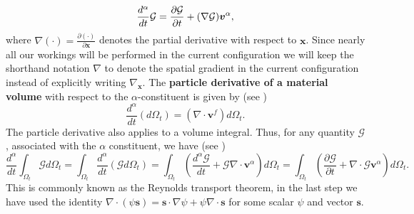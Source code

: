 \begin{equation}
\frac{d^{\alpha}}{dt} \mathcal{G}=\frac{\partial \mathcal{G}}{\partial t}  + (\nabla\mathcal{G})\boldsymbol{v}^{\alpha},
\end{equation}
where $\nabla( \cdot)= \frac{\partial (\cdot) }{\partial \boldsymbol{x} } $ denotes the partial derivative with respect to $\boldsymbol{x}$. Since nearly all our workings will be performed in the current configuration we will keep the shorthand notation $\nabla$ to denote the spatial gradient in the current configuration instead of explicitly writing  $\nabla_{\boldsymbol{x}}$. The \textbf{particle derivative of a material volume} with respect to the $\alpha$-constituent is given by (see \citep[eqn. (1.42)]{coussy2004poromechanics})
\begin{equation}
\frac{d^{\alpha}}{dt} (d \Omega_{t})=\left(\nabla \cdot \boldsymbol{v}^{f}   \right)d \Omega_{t}. 
\end{equation}
The particle derivative also applies to a volume integral. Thus, for any quantity $\mathcal{G}$, associated with the $\alpha$ constituent, we have (see \citep[eqn. (1.47)]{coussy2004poromechanics})
\begin{equation}
\label{eqn:reynolds_transport}
\frac{d^{\alpha}}{dt} \int_{\Omega_{t}} \mathcal{G} d \Omega_{t} =  \int_{\Omega_{t}} \frac{d^{\alpha}}{dt}(\mathcal{G} d \Omega_{t})= \int_{\Omega_{t}} \left( \frac{d^{\alpha}\mathcal{G}}{dt} + \mathcal{G} \nabla \cdot \boldsymbol{v}^{\alpha} \right) d \Omega_{t}= \int_{\Omega_{t}} \left( \frac{\partial \mathcal{G}}{ \partial t} +  \nabla \cdot \mathcal{G} \boldsymbol{v}^{\alpha} \right) d \Omega_{t}.
\end{equation}
This is commonly known as the Reynolds transport theorem, in the last step we have used the identity  $\nabla \cdot (\psi \boldsymbol{s}) =  \boldsymbol{s} \cdot \nabla \psi + \psi \nabla \cdot \boldsymbol{s} $ for some scalar $\psi$ and vector $\boldsymbol{s}$.